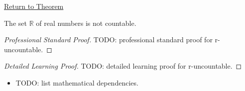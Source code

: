 \newpage
{}
\label{prf:r-uncountable}
\label{prf:R-uncountable}

\begin{remark*}[Return]
\hyperref[thm:R-uncountable]{Return to Theorem}
\end{remark*}


\begin{theorem*}
The set $\mathbb{R}$ of real numbers is not countable.
\end{theorem*}

\begin{proof}[Professional Standard Proof]
\LRAProofBodyStart
TODO: professional standard proof for r-uncountable.
\end{proof}

\begin{proof}[Detailed Learning Proof]
\LRAProofBodyStart
TODO: detailed learning proof for r-uncountable.
\end{proof}

\begin{remark*}
\end{remark*}

\begin{dependencies}
\begin{itemize}
  \item TODO: list mathematical dependencies.
\end{itemize}
\end{dependencies}

\clearpage
